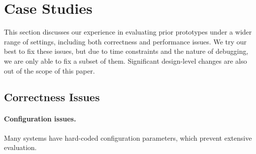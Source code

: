 \section{Case Studies}
\label{sec:cases}

This section discusses our experience in evaluating prior prototypes under
a wider range of settings, including both correctness and performance issues.
We try our best to fix these issues, but due to time constraints and the nature of debugging, we
are only able to fix a subset of them. Significant design-level changes are also out of the scope
of this paper.

\subsection{Correctness Issues}

\paragraph{Configuration issues.}

Many systems have hard-coded configuration parameters, which prevent extensive evaluation.

